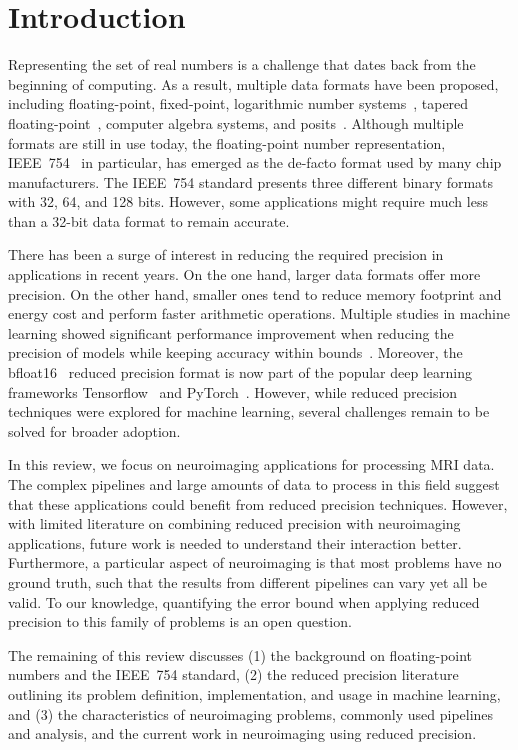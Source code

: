 \chapter{Introduction}
\label{ch:introduction}

Representing the set of real numbers  is a challenge that dates back from the beginning of computing.
As a result, multiple data formats have been proposed, including floating-point, fixed-point, 
logarithmic number systems~\cite{Kingsbury1971-kx}, tapered floating-point~\cite{Morris1971-qg}, 
computer algebra systems, and posits~\cite{Gustafson2017-wo}.
Although multiple formats are still in use today, the floating-point number 
representation, IEEE~754~\cite{ieee754_2008-ev} in particular, has emerged as 
the de-facto format used by many chip manufacturers.
The IEEE~754 standard presents three different binary formats with 32, 64, and 128 bits.
However, some applications might require much less than a 32-bit data format to
remain accurate.

There has been a surge of interest in reducing the required precision in applications in recent years.
On the one hand, larger data formats offer more precision.
On the other hand, smaller ones tend to reduce memory footprint and energy cost
and perform faster arithmetic operations.
Multiple studies in machine learning showed significant performance improvement when reducing
the precision of models while keeping accuracy within bounds~\cite{Johnson2018-up,Wang2018-oo,Lesser2011-mn,Chen2018-an,Judd2015-kw,Vicuna2021-mw}.
Moreover, the bfloat16~\cite{bfloat16} reduced precision format is now part of the
popular deep learning frameworks Tensorflow~\cite{tensorflow2015-whitepaper} and PyTorch~\cite{PyTorch_2019}.
However, while reduced precision techniques were explored for machine learning,
several challenges remain to be solved for broader adoption.

In this review, we focus on neuroimaging applications for processing MRI data.
The complex pipelines and large amounts of data to process in this field suggest that these
applications could benefit from reduced precision techniques.
However, with limited literature on combining reduced precision with neuroimaging
applications, future work is needed to understand their interaction better.
Furthermore, a particular aspect of neuroimaging is that most problems have no
ground truth,  such that the results from different pipelines can vary yet all be valid.
To our knowledge, quantifying the error bound when applying reduced precision to
this family of problems is an open question.

The remaining of this review discusses (1) the background on floating-point numbers
and the IEEE~754 standard, (2) the reduced precision literature outlining its
problem definition, implementation, and usage in machine learning, and (3) the
characteristics of neuroimaging problems, commonly used pipelines and analysis,
and the current work in neuroimaging using reduced precision.
